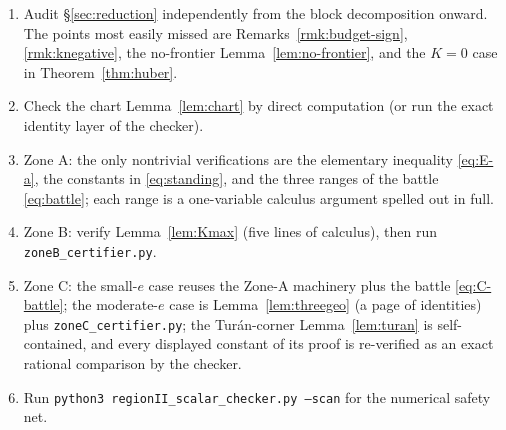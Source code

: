 \documentclass[11pt]{article}
\begin{document}
\begin{enumerate}[label=\textup{(\alph*)}]
\item Audit \S\ref{sec:reduction} independently from the block
decomposition onward.  The points most easily missed are
Remarks~\ref{rmk:budget-sign}, \ref{rmk:knegative}, the no-frontier
Lemma~\ref{lem:no-frontier}, and the $K=0$ case in
Theorem~\ref{thm:huber}.
\item Check the chart Lemma~\ref{lem:chart} by direct computation (or run
the exact identity layer of the checker).
\item Zone A: the only nontrivial verifications are the elementary
inequality \eqref{eq:E-a}, the constants in \eqref{eq:standing}, and the
three ranges of the battle \eqref{eq:battle}; each range is a one-variable
calculus argument spelled out in full.
\item Zone B: verify Lemma~\ref{lem:Kmax} (five lines of calculus), then
run \texttt{zoneB\_certifier.py}.
\item Zone C: the small-$e$ case reuses the Zone-A machinery plus the
battle \eqref{eq:C-battle}; the moderate-$e$ case is
Lemma~\ref{lem:threegeo} (a page of identities) plus
\texttt{zoneC\_certifier.py}; the Tur\'an-corner Lemma~\ref{lem:turan} is
self-contained, and every displayed constant of its proof is re-verified
as an exact rational comparison by the checker.
\item Run \texttt{python3 regionII\_scalar\_checker.py --scan} for the
numerical safety net.
\end{enumerate}
\end{document}
